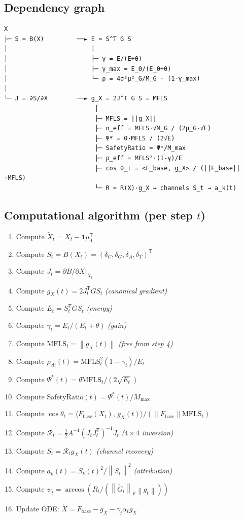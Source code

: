 \documentclass[11pt,a4paper]{article}
\theoremstyle{definition}
\newcommand{\T}{^{\mathsf{T}}}
\newcommand{\norm}[1]{\left\|#1\right\|}
\newcommand{\inner}[2]{\langle #1,\,#2\rangle}
\newcommand{\Fbase}{F_{\mathrm{base}}}
\newcommand{\gX}{g_X}
\newcommand{\mfls}{\mathrm{MFLS}}
\begin{document}
\subsection{Dependency graph}

\begin{verbatim}
X
├─ S = B(X)         ──► E = S^T G S
│                       │
│                       ├─ γ = E/(E+θ)
│                       ├─ γ_max = E_0/(E_0+θ)
│                       └─ ρ = 4σ²μ²_G/M_G · (1-γ_max)
│
└─ J = ∂S/∂X        ──► g_X = 2J^T G S = MFLS
                         │
                         ├─ MFLS = ||g_X||
                         ├─ σ_eff = MFLS·√M_G / (2μ_G·√E)
                         ├─ Ψ* = θ·MFLS / (2√E)
                         ├─ SafetyRatio = Ψ*/M_max
                         ├─ ρ_eff = MFLS²·(1-γ)/E
                         ├─ cos θ_t = <F_base, g_X> / (||F_base||·MFLS)
                         └─ R = R(X)·g_X → channels S_t → a_k(t)
\end{verbatim}

\subsection{Computational algorithm (per step $t$)}

\begin{enumerate}
\item Compute $\tilde X_t = X_t - \mathbf{1}\mu_0\T$
\item Compute $S_t = B(X_t) = (\delta_C,\delta_G,\delta_A,\delta_T)\T$
\item Compute $J_t = \partial B/\partial X|_{X_t}$
\item Compute $\gX(t) = 2J_t\T G S_t$ \hfill \textit{(canonical gradient)}
\item Compute $E_t = S_t\T G S_t$ \hfill \textit{(energy)}
\item Compute $\gamma_t = E_t/(E_t+\theta)$ \hfill \textit{(gain)}
\item Compute $\mfls_t = \norm{\gX(t)}$ \hfill \textit{(free from step 4)}
\item Compute $\rho_\mathrm{eff}(t) = \mfls_t^2(1-\gamma_t)/E_t$
\item Compute $\Psi^*(t) = \theta\mfls_t/(2\sqrt{E_t})$
\item Compute $\mathrm{SafetyRatio}(t) = \Psi^*(t)/M_\mathrm{max}$
\item Compute $\cos\theta_t = \inner{F_\mathrm{base}(X_t)}{\gX(t)}/(\norm{F_\mathrm{base}}\mfls_t)$
\item Compute $\mathcal{R}_t = \frac{1}{2}A^{-1}(J_tJ_t\T)^{-1}J_t$ \hfill \textit{($4\times4$ inversion)}
\item Compute $S_t = \mathcal{R}_t\gX(t)$ \hfill \textit{(channel recovery)}
\item Compute $a_k(t) = \tilde S_k(t)^2/\norm{\tilde S_t}^2$ \hfill \textit{(attribution)}
\item Compute $\psi_t = \arccos(R_t/(\norm{\tilde G_t}_F\norm{g_t}))$
\item Update ODE: $\dot X = \Fbase - \gX - \gamma_t\alpha_t\gX$
\end{enumerate}
\end{document}
